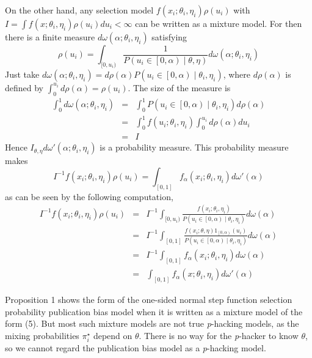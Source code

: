 On the other hand, any selection model $f(x_{i};\theta_{i},\eta_{i})\rho(u_i)$ with $I =\int f(x;\theta_{i},\eta_{i})\rho(u_i)du_i<\infty$ can be written as a mixture model. For then there is a finite measure $d\omega(\alpha;\theta_{i},\eta_{i})$ satisfying 
\[
\rho(u_i)=\int_{[0,u_i)}\frac{1}{P(u_i\in\left[0,\alpha\right)\mid\theta,\eta)}d\omega(\alpha;\theta_{i},\eta_{i})
\]
Just take $d\omega(\alpha;\theta_{i},\eta_{i})=d\rho(\alpha)P(u_i\in\left[0,\alpha\right)\mid\theta_{i},\eta_{i})$, where $d\rho(\alpha)$ is defined by $\int_{0}^{u_i}d\rho(\alpha)=\rho(u_i)$. The size of the measure is
\begin{eqnarray*}
\int_{0}^{1}d\omega(\alpha;\theta_{i},\eta_{i}) & = & \int_{0}^{1}P(u_i\in\left[0,\alpha\right)\mid\theta_{i},\eta_{i})d\rho(\alpha)\\
 & = & \int_{0}^{1}f(u_i;\theta_{i},\eta_{i})\int_{0}^{u_i}d\rho(\alpha)du_i\\
 & = & I
\end{eqnarray*}
Hence $I_{\theta,\eta}d\omega'(\alpha;\theta_{i},\eta_{i})$ is a probability measure. This probability measure makes 
\[
I^{-1}f(x_{i};\theta_{i},\eta_{i})\rho(u_i)=\int_{[0,1]}f_\alpha(x_{i};\theta_{i},\eta_{i})d\omega'(\alpha)
\]
as can be seen by the following computation,
\begin{eqnarray*}
I^{-1}f(x_{i};\theta_{i},\eta_{i})\rho(u_i) & = & I^{-1}\int_{[0,u_i)}\frac{f(x_{i};\theta_{i},\eta_{i})}{P(u_i\in\left[0,\alpha\right)\mid\theta_{i},\eta_{i})}d\omega(\alpha)\\
 & = & I^{-1}\int_{[0,1]}\frac{f(x_{i};\theta,\eta)1_{\left[0,\alpha\right)}(u_i)}{P(u_i\in\left[0,\alpha\right)\mid\theta_{i},\eta_{i})}d\omega(\alpha)\\
 & = & I^{-1}\int_{[0,1]}f_\alpha(x_{i};\theta_{i},\eta_{i})d\omega(\alpha)\\
 & = & \int_{[0,1]}f_\alpha(x;\theta_{i},\eta_{i})d\omega'(\alpha)
\end{eqnarray*}

Proposition 1 shows the form of the one-sided normal step function selection probability publication bias model when it is written as a mixture model of the form (5). But most such mixture models are not true \textit{p}-hacking models, as the mixing probabilities $\pi_{i}^{\star}$ depend on $\theta$. There is no way for the \textit{p}-hacker to know
$\theta$, so we cannot regard the publication bias model as a \textit{p}-hacking model.
